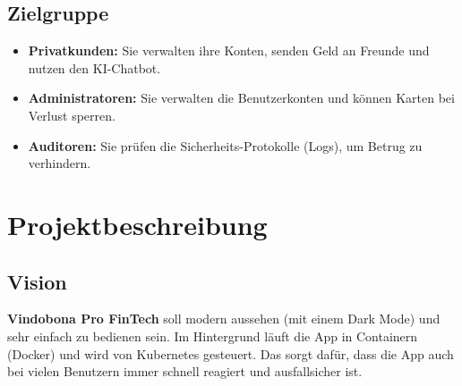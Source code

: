 \documentclass[11pt,a4paper]{article}
\begin{document}
\subsection{Zielgruppe}
\begin{itemize}
    \item \textbf{Privatkunden:} Sie verwalten ihre Konten, senden Geld an Freunde und nutzen den KI-Chatbot.
    \item \textbf{Administratoren:} Sie verwalten die Benutzerkonten und können Karten bei Verlust sperren.
    \item \textbf{Auditoren:} Sie prüfen die Sicherheits-Protokolle (Logs), um Betrug zu verhindern.
\end{itemize}

\newpage

\section{Projektbeschreibung}

\subsection{Vision}
\textbf{Vindobona Pro FinTech} soll modern aussehen (mit einem Dark Mode) und sehr einfach zu bedienen sein. Im Hintergrund läuft die App in Containern (Docker) und wird von Kubernetes gesteuert. Das sorgt dafür, dass die App auch bei vielen Benutzern immer schnell reagiert und ausfallsicher ist.
\end{document}
